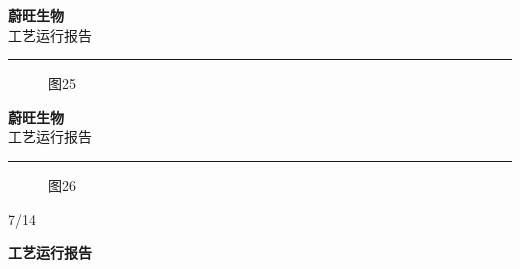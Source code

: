 \documentclass[UTF8,10pt,a4paper,fontset=fandol]{ctexart}
\newcommand{\handwritten}[1]{#1}
\begin{document}
\noindent
\begin{minipage}[t]{0.46\linewidth}
\centering
\textbf{蔚旺生物}\\[0.4em]
工艺运行报告\\[-0.2em]
\rule{\linewidth}{0.4pt}

\vspace{0.8em}
\begin{figure}[h]
\centering
{}
\caption{图25}
\end{figure}
\end{minipage}
\hfill
\begin{minipage}[t]{0.46\linewidth}
\centering
\textbf{蔚旺生物}\\[0.4em]
工艺运行报告\\[-0.2em]
\rule{\linewidth}{0.4pt}

\vspace{0.8em}
\begin{figure}[h]
\centering
{}
\caption{图26}
\end{figure}
\end{minipage}

\vfill

\begin{flushright}
\handwritten{7/14}
\end{flushright}

\newpage

\begin{center}
\textbf{工艺运行报告}
\end{center}
\end{document}
